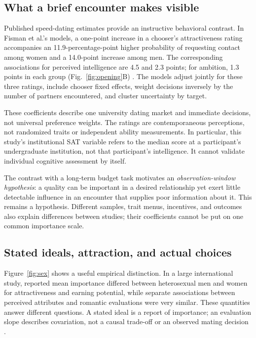 \documentclass[10pt,twocolumn,letterpaper]{article}
\begin{document}
\subsection{What a brief encounter makes visible}
Published speed-dating estimates provide an instructive behavioral contrast. In Fisman et al.'s models, a one-point increase in a chooser's attractiveness rating accompanies an 11.9-percentage-point higher probability of requesting contact among women and a 14.0-point increase among men. The corresponding associations for perceived intelligence are 4.5 and 2.3 points; for ambition, 1.3 points in each group (Fig.~\ref{fig:opening}B) \citep{fisman2006}. The models adjust jointly for these three ratings, include chooser fixed effects, weight decisions inversely by the number of partners encountered, and cluster uncertainty by target.

These coefficients describe one university dating market and immediate decisions, not universal preference weights. The ratings are contemporaneous perceptions, not randomized traits or independent ability measurements. In particular, this study's institutional SAT variable refers to the median score at a participant's undergraduate institution, not that participant's intelligence. It cannot validate individual cognitive assessment by itself.

The contrast with a long-term budget task motivates an \emph{observation-window hypothesis}: a quality can be important in a desired relationship yet exert little detectable influence in an encounter that supplies poor information about it. This remains a hypothesis. Different samples, trait menus, incentives, and outcomes also explain differences between studies; their coefficients cannot be put on one common importance scale.

\subsection{Stated ideals, attraction, and actual choices}
Figure~\ref{fig:sex} shows a useful empirical distinction. In a large international study, reported mean importance differed between heterosexual men and women for attractiveness and earning potential, while separate associations between perceived attributes and romantic evaluations were very similar. These quantities answer different questions. A stated ideal is a report of importance; an evaluation slope describes covariation, not a causal trade-off or an observed mating decision \citep{matching2025}.
\end{document}
